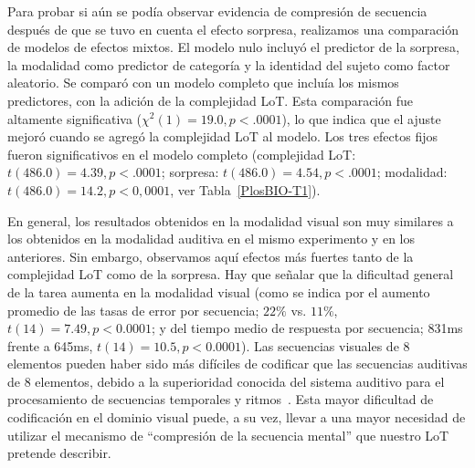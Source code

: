 Para probar si aún se podía observar evidencia de compresión de secuencia después de que se tuvo en cuenta el efecto sorpresa, realizamos una comparación de modelos de efectos mixtos. El modelo nulo incluyó el predictor de la sorpresa, la modalidad como predictor de categoría y la identidad del sujeto como factor aleatorio. Se comparó con un modelo completo que incluía los mismos predictores, con la adición de la complejidad LoT. Esta comparación fue altamente significativa ($\chi^2 (1) = 19.0, p < .0001$), lo que indica que el ajuste mejoró cuando se agregó la complejidad LoT al modelo. Los tres efectos fijos fueron significativos en el modelo completo (complejidad LoT: $t (486.0) = 4.39, p < .0001$; sorpresa: $t (486.0) = 4.54, p < .0001$; modalidad: $t (486.0) = 14.2, p <0,0001$, ver Tabla~\ref{PlosBIO-T1}).


En general, los resultados obtenidos en la modalidad visual son muy similares a los obtenidos en la modalidad auditiva en el mismo experimento y en los anteriores. Sin embargo, observamos aquí efectos más fuertes tanto de la complejidad LoT como de la sorpresa. Hay que señalar que la dificultad general de la tarea aumenta en la modalidad visual (como se indica por el aumento promedio de las tasas de error por secuencia; $22\%$ vs. $11 \%$, $t (14) = 7.49, p <0.0001$; y del tiempo medio de respuesta por secuencia; 831ms frente a 645ms, $t(14) = 10.5, p <0.0001$). Las secuencias visuales de 8 elementos pueden haber sido más difíciles de codificar que las secuencias auditivas de 8 elementos, debido a la superioridad conocida del sistema auditivo para el procesamiento de secuencias temporales y ritmos~\cite{f90,f92}. Esta mayor dificultad de codificación en el dominio visual puede, a su vez, llevar a una mayor necesidad de utilizar el mecanismo de ``compresión de la secuencia mental'' que nuestro LoT pretende describir.


